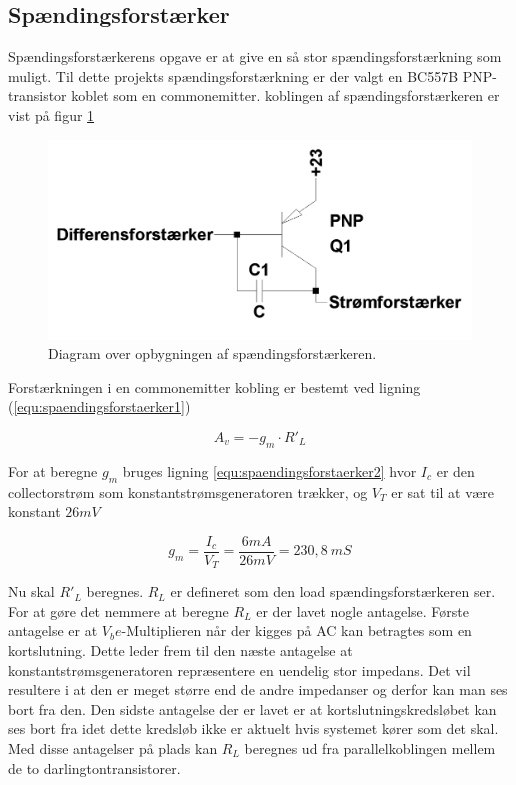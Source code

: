 \subsection{Spændingsforstærker}
\label{effekt_spaendingsforstaerker}
Spændingsforstærkerens opgave er at give en så stor spændingsforstærkning som muligt. Til dette projekts spændingsforstærkning er der valgt en BC557B PNP-transistor koblet som en commonemitter. koblingen af spændingsforstærkeren er vist på figur \ref{spaendingsforstaerker_diagram}

\begin{figure}[h]
\centering
\includegraphics[width=\textwidth]{teknisk/effektforstaerker/spaendingsforstaerker_diagram.png}
\caption{Diagram over opbygningen af spændingsforstærkeren.}
\label{spaendingsforstaerker_diagram}
\end{figure}

Forstærkningen i en commonemitter kobling er bestemt ved ligning (\ref{equ:spaendingsforstaerker1}) 

\begin{equation}
\label{equ:spaendingsforstaerker1}
A_v = -g_m \cdot R'_L
\end{equation}

For at beregne $g_m$ bruges ligning \ref{equ:spaendingsforstaerker2} hvor $I_c$ er den collectorstrøm som konstantstrømsgeneratoren trækker, og $V_T$ er sat til at være konstant $26 mV$

\begin{equation}
\label{equ:spaendingsforstaerker2}
g_m = \frac{I_c}{V_T} = \frac{6 mA}{26 mV} = 230,8~mS
\end{equation}

Nu skal $R'_L$ beregnes. $R_L$ er defineret som den load spændingsforstærkeren ser. For at gøre det nemmere at beregne $R_L$ er der lavet nogle antagelse. Første antagelse er at $V_be$-Multiplieren når der kigges på AC kan betragtes som en kortslutning. Dette leder frem til den næste antagelse at konstantstrømsgeneratoren repræsentere en uendelig stor impedans. Det vil resultere i at den er meget større end de andre impedanser og derfor kan man ses bort fra den. Den sidste antagelse der er lavet er at kortslutningskredsløbet kan ses bort fra idet dette kredsløb ikke er aktuelt hvis systemet  kører som det skal. Med disse antagelser på plads kan $R_L$ beregnes ud fra parallelkoblingen mellem de to darlingtontransistorer.



